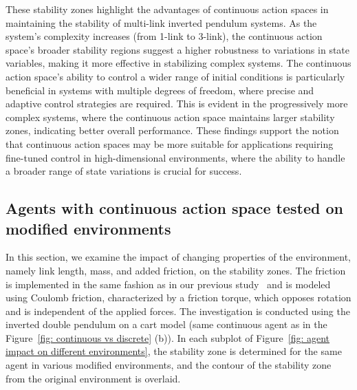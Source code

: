 These stability zones highlight the advantages of continuous action spaces in maintaining the stability of multi-link inverted pendulum systems. As the system's complexity increases (from 1-link to 3-link), the continuous action space's broader stability regions suggest a higher robustness to variations in state variables, making it more effective in stabilizing complex systems.
The continuous action space's ability to control a wider range of initial conditions is particularly beneficial in systems with multiple degrees of freedom, where precise and adaptive control strategies are required. This is evident in the progressively more complex systems, where the continuous action space maintains larger stability zones, indicating better overall performance.
These findings support the notion that continuous action spaces may be more suitable for applications requiring fine-tuned control in high-dimensional environments, where the ability to handle a broader range of state variations is crucial for success.

\subsection{Agents with continuous action space tested on modified environments} \label{subsec: Agent tested on modified environments}

In this section, we examine the impact of changing properties of the environment, namely
link length, mass, and added friction, on the stability zones. The friction is implemented in the same fashion as in our previous study~\cite{manzl2023relrl} and is modeled using Coulomb friction, characterized by a friction torque, which opposes rotation and is independent of the applied forces. The investigation is conducted
using the inverted double pendulum on a cart model (same continuous agent as in the Figure~\ref{fig: continuous vs discrete} (b)). In each subplot of Figure~\ref{fig: agent impact on different environments}, the stability zone is determined for the same agent in various modified environments, and the contour of the stability zone from the original environment is overlaid.

